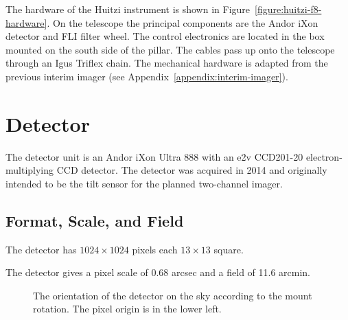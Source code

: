 The hardware of the Huitzi instrument is shown in Figure~\ref{figure:huitzi-f8-hardware}. On the telescope the principal components are the Andor iXon detector and FLI filter wheel. The control electronics are located in the box mounted on the south side of the pillar. The cables pass up onto the telescope through an Igus Triflex chain. The mechanical hardware is adapted from the previous interim imager (see Appendix~\ref{appendix:interim-imager}).

\section{Detector}

The detector unit is an Andor iXon Ultra 888 with an e2v CCD201-20 electron-multiplying CCD detector. The detector was acquired in 2014 and originally intended to be the tilt sensor for the planned two-channel imager.

\subsection{Format, Scale, and Field}

The detector has $1024\times1024$ pixels each $13\times13$ {\micron} square. 

The detector gives a pixel scale of 0.68 arcsec and a field of 11.6 arcmin. 

\begin{figure}
\begin{center}
\end{center}
\caption{The orientation of the detector on the sky according to the mount rotation. The pixel origin is in the lower left.}
\label{figure:huitzi-f8-detector-orientation}
\end{figure}


